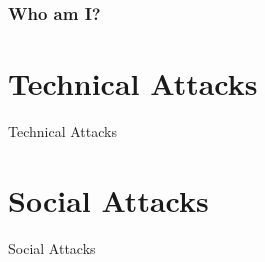 \documentclass[aspectratio=169,x11names]{beamer}
\begin{document}
\begin{frame}
\frametitle{Who am I?}
\end{frame}


\section{Technical Attacks}
\begin{frame}
\begin{center}
\huge Technical Attacks
\end{center}
\end{frame}


\section{Social Attacks}
\begin{frame}
\begin{center}
\huge Social Attacks
\end{center}
\end{frame}
\end{document}
